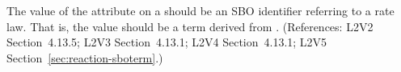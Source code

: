 The value of the  attribute on a \KineticLaw should be an SBO
identifier referring to a rate law.  That is, the value should be a term
derived from \sboratelaw.  (References: L2V2 Section~4.13.5; L2V3
Section~4.13.1; L2V4 Section~4.13.1; L2V5 Section~\ref{sec:reaction-sboterm}.)

